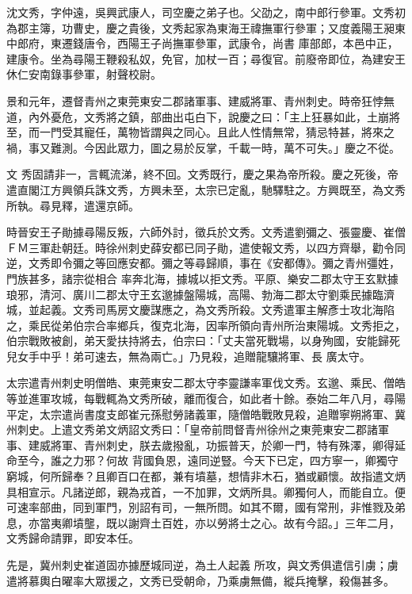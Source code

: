 \begin{pinyinscope}
 沈文秀，字仲遠，吳興武康人，司空慶之弟子也。父劭之，南中郎行參軍。文秀初為郡主簿，功曹史，慶之貴後，文秀起家為東海王禕撫軍行參軍；又度義陽王昶東中郎府，東遷錢唐令，西陽王子尚撫軍參軍，武康令，尚書
 庫部郎，本邑中正，建康令。坐為尋陽王鞭殺私奴，免官，加杖一百；尋復官。前廢帝即位，為建安王休仁安南錄事參軍，射聲校尉。



 景和元年，遷督青州之東莞東安二郡諸軍事、建威將軍、青州刺史。時帝狂悖無道，內外憂危，文秀將之鎮，部曲出屯白下，說慶之曰：「主上狂暴如此，土崩將至，而一門受其寵任，萬物皆謂與之同心。且此人性情無常，猜忌特甚，將來之禍，事又難測。今因此眾力，圖之易於反掌，千載一時，萬不可失。」慶之不從。



 文
 秀固請非一，言輒流涕，終不回。文秀既行，慶之果為帝所殺。慶之死後，帝遣直閣江方興領兵誅文秀，方興未至，太宗已定亂，馳驛駐之。方興既至，為文秀所執。尋見釋，遣還京師。



 時晉安王子勛據尋陽反叛，六師外討，徵兵於文秀。文秀遣劉彌之、張靈慶、崔僧ＦＭ三軍赴朝廷。時徐州刺史薛安都已同子勛，遣使報文秀，以四方齊舉，勸令同逆，文秀即令彌之等回應安都。彌之等尋歸順，事在《安都傳》。彌之青州彊姓，門族甚多，諸宗從相合
 率奔北海，據城以拒文秀。平原、樂安二郡太守王玄默據琅邪，清河、廣川二郡太守王玄邈據盤陽城，高陽、勃海二郡太守劉乘民據臨濟城，並起義。文秀司馬房文慶謀應之，為文秀所殺。文秀遣軍主解彥士攻北海陷之，乘民從弟伯宗合率鄉兵，復克北海，因率所領向青州所治東陽城。文秀拒之，伯宗戰敗被創，弟天愛扶持將去，伯宗曰：「丈夫當死戰場，以身殉國，安能歸死兒女手中乎！弟可速去，無為兩亡。」乃見殺，追贈龍驤將軍、長
 廣太守。



 太宗遣青州刺史明僧皓、東莞東安二郡太守李靈謙率軍伐文秀。玄邈、乘民、僧皓等並進軍攻城，每戰輒為文秀所破，離而復合，如此者十餘。泰始二年八月，尋陽平定，太宗遣尚書度支郎崔元孫慰勞諸義軍，隨僧皓戰敗見殺，追贈寧朔將軍、冀州刺史。上遣文秀弟文炳詔文秀曰：「皇帝前問督青州徐州之東莞東安二郡諸軍事、建威將軍、青州刺史，朕去歲撥亂，功振普天，於卿一門，特有殊澤，卿得延命至今，誰之力邪？何故
 背國負恩，遠同逆豎。今天下已定，四方寧一，卿獨守窮城，何所歸奉？且卿百口在都，兼有墳墓，想情非木石，猶或顧懷。故指遣文炳具相宣示。凡諸逆郎，親為戎首，一不加罪，文炳所具。卿獨何人，而能自立。便可速率部曲，同到軍門，別詔有司，一無所問。如其不爾，國有常刑，非惟戮及弟息，亦當夷卿墳壟，既以謝齊土百姓，亦以勞將士之心。故有今詔。」三年二月，文秀歸命請罪，即安本任。



 先是，冀州刺史崔道固亦據歷城同逆，為土人起義
 所攻，與文秀俱遣信引虜；虜遣將慕輿白曜率大眾援之，文秀已受朝命，乃乘虜無備，縱兵掩擊，殺傷甚多。




\end{pinyinscope}
